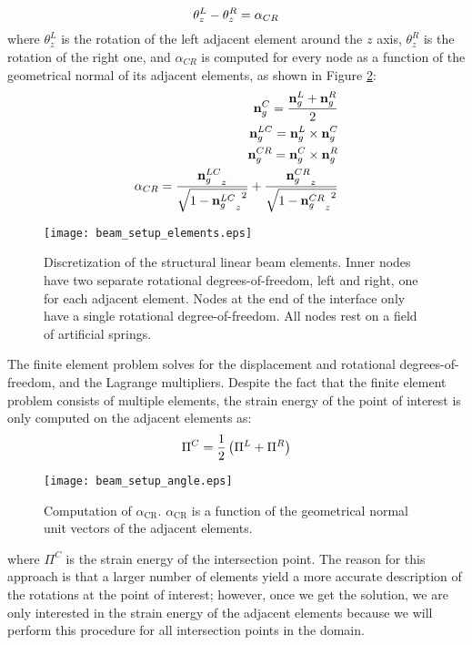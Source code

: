 %
\begin{equation}
	\centering
	\label{eq:continuous_rotation}
	\theta^{L}_{z} - \theta^{R}_{z} = \alpha_{CR}
\end{equation}
%
where $\theta^{L}_{z}$ is the rotation of the left adjacent element around the $z$ axis, $\theta^{R}_{z}$ is the rotation of the right one, and $\alpha_{CR}$ is computed for every node as a function of the geometrical normal of its adjacent elements, as shown in Figure \ref{fig:beam_setup_angle}:
%
\begin{equation}
	\centering
	\begin{split}
	\mathbf{n}_{g}^{C}  = \frac{\mathbf{n}_{g}^{L} + \mathbf{n}_{g}^{R}}{2} \\
	\mathbf{n}_{g}^{LC} = \mathbf{n}_{g}^{L} \times \mathbf{n}_{g}^{C} \\
	\mathbf{n}_{g}^{CR} = \mathbf{n}_{g}^{C} \times \mathbf{n}_{g}^{R} \\
	\alpha_{CR} = \frac{{\mathbf{n}_{g}^{LC}}_{z}}{\sqrt{1 - {{\mathbf{n}_{g}^{LC}}_{z}}^{2}}} + \frac{{\mathbf{n}_{g}^{CR}}_{z}}{\sqrt{1 - {{\mathbf{n}_{g}^{CR}}_{z}}^{2}}}
	\end{split}
\end{equation}
%
\begin{figure}
	\centering
	\texttt{[image: beam\_setup\_elements.eps]}
	\caption{Discretization of the structural linear beam elements. Inner nodes have two separate rotational degrees-of-freedom, left and right, one for each adjacent element. Nodes at the end of the interface only have a single rotational degree-of-freedom. All nodes rest on a field of artificial springs.}
	\label{fig:beam_setup_elements}
\end{figure}
%
The finite element problem solves for the displacement and rotational degrees-of-freedom, and the Lagrange multipliers. Despite the fact that the finite element problem consists of multiple elements, the strain energy of the point of interest is only computed on the adjacent elements as:
%
\begin{equation}
	\centering
	\label{eq:strain_energy_adjacent}
	\Pi^{C} = \frac{1}{2}\left(\Pi^{L} + \Pi^{R}\right)
\end{equation}
%
\begin{figure}
	\centering
	\texttt{[image: beam\_setup\_angle.eps]}
	\caption{Computation of $\alpha_{\mathrm{CR}}$. $\alpha_{\mathrm{CR}}$ is a function of the geometrical normal unit vectors of the adjacent elements.}
	\label{fig:beam_setup_angle}
\end{figure}
%
where $\Pi^{C}$ is the strain energy of the intersection point. The reason for this approach is that a larger number of elements yield a more accurate description of the rotations at the point of interest; however, once we get the solution, we are only interested in the strain energy of the adjacent elements because we will perform this procedure for all intersection points in the domain.

